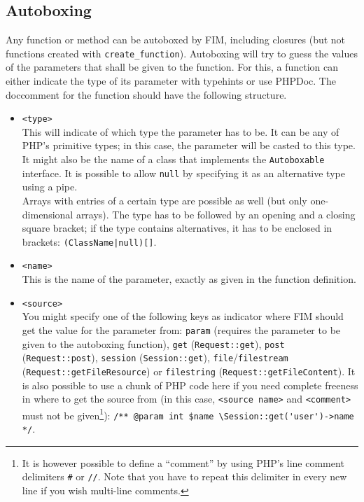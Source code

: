 \documentclass{scrartcl}
\begin{document}
   \subsection{Autoboxing}
      Any function or method can be autoboxed by FIM, including closures (but not functions created with \lstinline!create_function!). Autoboxing will try to guess the values of the parameters that shall be given to the function. For this, a function can either indicate the type of its parameter with typehints or use PHPDoc. The doccomment for the function should have the following structure.
      \begin{itemize}
         \item \texttt{<type>} \\
            This will indicate of which type the parameter has to be. It can be any of PHP's primitive types; in this case, the parameter will be casted to this type. It might also be the name of a class that implements the \lstinline!Autoboxable! interface. It is possible to allow \lstinline!null! by specifying it as an alternative type using a pipe. \\
            Arrays with entries of a certain type are possible as well (but only one-dimensional arrays). The type has to be followed by an opening and a closing square bracket; if the type contains alternatives, it has to be enclosed in brackets: \texttt{(ClassName|null)[]}.
         \item \texttt{<name>} \\
            This is the name of the parameter, exactly as given in the function definition.
         \item \texttt{<source>} \\
            You might specify one of the following keys as indicator where FIM should get the value for the parameter from: \texttt{param} (requires the parameter to be given to the autoboxing function), \texttt{get} (\lstinline!Request::get!), \texttt{post} (\lstinline!Request::post!), \texttt{session} (\lstinline!Session::get!), \texttt{file}/\texttt{filestream} (\lstinline!Request::getFileResource!) or \texttt{filestring} (\lstinline!Request::getFileContent!). It is also possible to use a chunk of PHP code here if you need complete freeness in where to get the source from (in this case, \texttt{<source name>} and \texttt{<comment>} must not be given\footnote{It is however possible to define a ``comment'' by using PHP's line comment delimiters \lstinline!#! or \lstinline!//!. Note that you have to repeat this delimiter in every new line if you wish multi-line comments.}): \lstinline!/** @param int $name \Session::get('user')->name */!. \\

\end{itemize}
\end{document}
